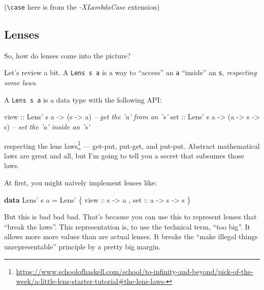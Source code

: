 \documentclass[]{article}
\newenvironment{Shaded}{}{}
\newcommand{\CommentTok}[1]{\textcolor[rgb]{0.38,0.63,0.69}{\textit{#1}}}
\newcommand{\DataTypeTok}[1]{\textcolor[rgb]{0.56,0.13,0.00}{#1}}
\newcommand{\FunctionTok}[1]{\textcolor[rgb]{0.02,0.16,0.49}{#1}}
\newcommand{\KeywordTok}[1]{\textcolor[rgb]{0.00,0.44,0.13}{\textbf{#1}}}
\newcommand{\NormalTok}[1]{#1}
\newcommand{\OtherTok}[1]{\textcolor[rgb]{0.00,0.44,0.13}{#1}}
\renewcommand{\href}[2]{#2\footnote{\url{#1}}}
\begin{document}
(\texttt{\textbackslash{}case} here is from the \emph{-XLambdaCase} extension)

\hypertarget{lenses}{%
\subsection{Lenses}\label{lenses}}

So, how do lenses come into the picture?

Let's review a bit. A \texttt{Lens\textquotesingle{}\ s\ a} is a way to
``access'' an \texttt{a} ``inside'' an \texttt{s}, \emph{respecting some laws}.

A \texttt{Lens\textquotesingle{}\ s\ a} is a data type with the following API:

\begin{Shaded}
\begin{Highlighting}[]
\OtherTok{view ::} \DataTypeTok{Lens'}\NormalTok{ s a }\OtherTok{->}\NormalTok{ (s }\OtherTok{->}\NormalTok{ a)                }\CommentTok{-- get the 'a' from an 's'}
\OtherTok{set  ::} \DataTypeTok{Lens'}\NormalTok{ s a }\OtherTok{->}\NormalTok{ (a }\OtherTok{->}\NormalTok{ s }\OtherTok{->}\NormalTok{ s)           }\CommentTok{-- set the 'a' inside an 's'}
\end{Highlighting}
\end{Shaded}

respecting
\href{https://www.schoolofhaskell.com/school/to-infinity-and-beyond/pick-of-the-week/a-little-lens-starter-tutorial\#the-lens-laws-}{the
lens laws} --- get-put, put-get, and put-put. Abstract mathematical laws are
great and all, but I'm going to tell you a secret that subsumes those laws.

At first, you might naively implement lenses like:

\begin{Shaded}
\begin{Highlighting}[]
\KeywordTok{data} \DataTypeTok{Lens'}\NormalTok{ s a }\FunctionTok{=} \DataTypeTok{Lens'}
\NormalTok{    \{}\OtherTok{ view ::}\NormalTok{ s }\OtherTok{->}\NormalTok{ a}
\NormalTok{    ,}\OtherTok{ set  ::}\NormalTok{ a }\OtherTok{->}\NormalTok{ s }\OtherTok{->}\NormalTok{ s}
\NormalTok{    \}}
\end{Highlighting}
\end{Shaded}

But this is bad bad bad. That's because you can use this to represent lenses
that ``break the laws''. This representation is, to use the technical term,
``too big''. It allows more more values than are actual lenses. It breaks the
``make illegal things unrepresentable'' principle by a pretty big margin.
\end{document}
